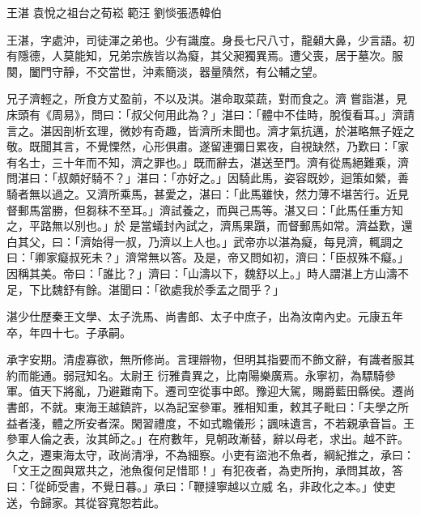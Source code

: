 
\begin{pinyinscope}
王湛
 袁悅之祖台之荀崧
 範汪
 劉惔張憑韓伯



 王湛，字處沖，司徒渾之弟也。少有識度。身長七尺八寸，龍顙大鼻，少言語。初有隱德，人莫能知，兄弟宗族皆以為癡，其父昶獨異焉。遭父喪，居于墓次。服闋，闔門守靜，不交當世，沖素簡淡，器量隤然，有公輔之望。



 兄子濟輕之，所食方丈盈前，不以及淇。湛命取菜蔬，對而食之。濟
 嘗詣湛，見床頭有《周易》，問曰：「叔父何用此為？」湛曰：「體中不佳時，脫復看耳。」濟請言之。湛因剖析玄理，微妙有奇趣，皆濟所未聞也。濟才氣抗邁，於湛略無子姪之敬。既聞其言，不覺慄然，心形俱肅。遂留連彌日累夜，自視缺然，乃歎曰：「家有名士，三十年而不知，濟之罪也。」既而辭去，湛送至門。濟有從馬絕難乘，濟問湛曰：「叔頗好騎不？」湛曰：「亦好之。」因騎此馬，姿容既妙，迴策如縈，善騎者無以過之。又濟所乘馬，甚愛之，湛曰：「此馬雖快，然力薄不堪苦行。近見督郵馬當勝，但芻秣不至耳。」濟試養之，而與己馬等。湛又曰：「此馬任重方知之，平路無以別也。」於
 是當蟻封內試之，濟馬果躓，而督郵馬如常。濟益歎，還白其父，曰：「濟始得一叔，乃濟以上人也。」武帝亦以湛為癡，每見濟，輒調之曰：「卿家癡叔死未？」濟常無以答。及是，帝又問如初，濟曰：「臣叔殊不癡。」因稱其美。帝曰：「誰比？」濟曰：「山濤以下，魏舒以上。」時人謂湛上方山濤不足，下比魏舒有餘。湛聞曰：「欲處我於季孟之間乎？」



 湛少仕歷秦王文學、太子洗馬、尚書郎、太子中庶子，出為汝南內史。元康五年卒，年四十七。子承嗣。



 承字安期。清虛寡欲，無所修尚。言理辯物，但明其指要而不飾文辭，有識者服其約而能通。弱冠知名。太尉王
 衍雅貴異之，比南陽樂廣焉。永寧初，為驃騎參軍。值天下將亂，乃避難南下。遷司空從事中郎。豫迎大駕，賜爵藍田縣侯。遷尚書郎，不就。東海王越鎮許，以為記室參軍。雅相知重，敕其子毗曰：「夫學之所益者淺，體之所安者深。閑習禮度，不如式瞻儀形；諷味遺言，不若親承音旨。王參軍人倫之表，汝其師之。」在府數年，見朝政漸替，辭以母老，求出。越不許。久之，遷東海太守，政尚清凈，不為細察。小吏有盜池不魚者，綱紀推之，承曰：「文王之囿與眾共之，池魚復何足惜耶！」有犯夜者，為吏所拘，承問其故，答曰：「從師受書，不覺日暮。」承曰：「鞭撻寧越以立威
 名，非政化之本。」使吏送，令歸家。其從容寬恕若此。




\end{pinyinscope}
